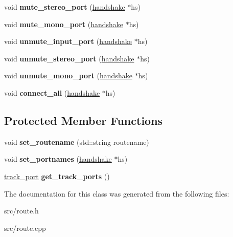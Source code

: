 \begin{DoxyCompactItemize}
void {\bfseries mute\+\_\+stereo\+\_\+port} (\mbox{\hyperlink{classhandshake}{handshake}} $\ast$hs)
\item 
\mbox{\label{classroute_a7e7951e060314418b99a844e69ac6ad0}} 
void {\bfseries mute\+\_\+mono\+\_\+port} (\mbox{\hyperlink{classhandshake}{handshake}} $\ast$hs)
\item 
\mbox{\label{classroute_a14034d6bb5397434136b7cec456ec29d}} 
void {\bfseries unmute\+\_\+input\+\_\+port} (\mbox{\hyperlink{classhandshake}{handshake}} $\ast$hs)
\item 
\mbox{\label{classroute_a0044cc75e5b0eb3f0cfd9c5e62464db8}} 
void {\bfseries unmute\+\_\+stereo\+\_\+port} (\mbox{\hyperlink{classhandshake}{handshake}} $\ast$hs)
\item 
\mbox{\label{classroute_a27bb2f9a0409464f18f73d0ec27b89cd}} 
void {\bfseries unmute\+\_\+mono\+\_\+port} (\mbox{\hyperlink{classhandshake}{handshake}} $\ast$hs)
\item 
\mbox{\label{classroute_ac1469913cf5f5563a4048df21b111def}} 
void {\bfseries connect\+\_\+all} (\mbox{\hyperlink{classhandshake}{handshake}} $\ast$hs)
\end{DoxyCompactItemize}
\subsection*{Protected Member Functions}
\begin{DoxyCompactItemize}
\item 
\mbox{\label{classroute_ae97fe2c45c8d34d6c9d2fbb15f533779}} 
void {\bfseries set\+\_\+routename} (std\+::string routename)
\item 
\mbox{\label{classroute_af94e9f62d745063a1e4eb374efff2c32}} 
void {\bfseries set\+\_\+portnames} (\mbox{\hyperlink{classhandshake}{handshake}} $\ast$hs)
\item 
\mbox{\label{classroute_a0fd630600c37944b7b161e60d5e3c320}} 
\mbox{\hyperlink{structtrack__port}{track\+\_\+port}} {\bfseries get\+\_\+track\+\_\+ports} ()
\end{DoxyCompactItemize}


The documentation for this class was generated from the following files\+:\begin{DoxyCompactItemize}
\item 
src/route.\+h\item 
src/route.\+cpp\end{DoxyCompactItemize}
